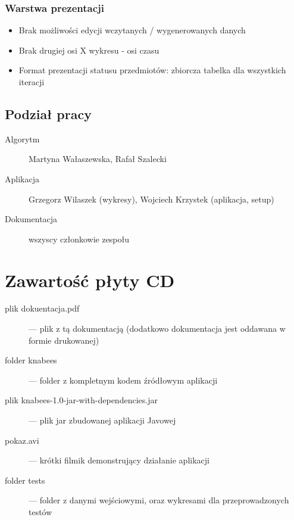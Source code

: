 \documentclass[a4paper,12pt,notitlepage]{mwrep}
\begin{document}
\subsection{Warstwa prezentacji}
\begin{itemize}
	\item	Brak możliwości edycji wczytanych / wygenerowanych danych
	\item	Brak drugiej osi X wykresu - osi czasu
	\item	Format prezentacji statusu przedmiotów: zbiorcza tabelka dla wszystkich iteracji
\end{itemize}

\section{Podział pracy}
\begin{description}
	\item[Algorytm] Martyna Wałaszewska, Rafał Szalecki
	\item[Aplikacja] Grzegorz Wilaszek (wykresy), Wojciech Krzystek (aplikacja, setup)
	\item[Dokumentacja] wszyscy członkowie zespołu
\end{description}


\addtocounter{page}{-1}

\appendix
\chapter*{Zawartość płyty CD}
\begin{description}
	\item[plik dokuentacja.pdf]	 --- plik z tą dokumentacją (dodatkowo dokumentacja jest oddawana w formie drukowanej)
	\item[folder knabees]	 --- folder z kompletnym kodem źródłowym aplikacji
	\item[plik knabees-1.0-jar-with-dependencies.jar]	 --- plik jar zbudowanej aplikacji Javowej
	\item[pokaz.avi]	 --- krótki filmik demonstrujący działanie aplikacji
	\item[folder tests]		--- folder z danymi wejściowymi, oraz wykresami dla przeprowadzonych testów
\end{description}
\end{document}
